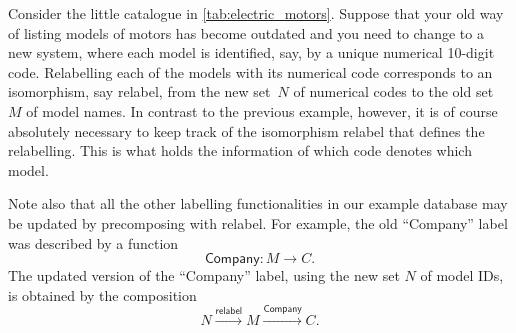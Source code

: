 
\begin{example}[Relabelling]
Consider the little catalogue in \cref{tab:electric_motors}. Suppose that your old way of listing models of motors has become outdated and you need to change to a new system, where each model is identified, say, by a unique numerical 10-digit code. Relabelling each of the models with its numerical code corresponds to an isomorphism, say \textsf{relabel}, from the new set~$N$ of numerical codes to the old set~$M$ of model names. In contrast to the previous example, however, it is of course absolutely necessary to keep track of the isomorphism \textsf{relabel} that defines the relabelling. This is what holds the information of which code denotes which model.

Note also that all the other labelling functionalities in our example database may be updated by precomposing with \textsf{relabel}. For example, the old ``Company'' label was described by a function
\begin{equation*}
\textsf{Company}\colon M \to C.
\end{equation*}
The updated version of the ``Company'' label, using the new set $N$ of model IDs, is obtained by the composition
\begin{equation*}
N \overset{\textsf{relabel}}{\longrightarrow} M \overset{\textsf{Company}}{\longrightarrow} C.
\end{equation*}
\end{example}

